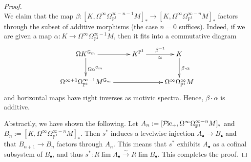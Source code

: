 \documentclass{amsart}
\theoremstyle{plain}
\theoremstyle{definition}
\theoremstyle{remark}
\numberwithin{equation}{theorem}
\newcommand{\mbb}[1]{\mathbb{#1}}
\newcommand{\OmegaP}{\Omega_{\mathbb{P}^1}}
\newcommand{\Pic}{{\mathcal{P}\mspace{-2.0mu}\mathrm{ic}}}
\begin{document}
\begin{proof}
\[\]
We claim that the map $\beta\colon[K,\Omega^\infty\OmegaP^{\infty-n-1}M]_*\to[K,\Omega^\infty\OmegaP^{\infty-n}M]_*$ factors through the subset of additive morphisms (the case $n=0$ suffices).
Indeed, if we are given a map $\alpha\colon K\to\Omega^\infty\OmegaP^{\infty-1} M$, then it fits into a commutative diagram
\[
\xymatrix{
	\Omega K^{\mbb{G}_m} \ar[r] \ar[d]^{\Omega\alpha^{\mbb{G}_m}} & K^{\mbb{P}^1} \ar[r]^-{\beta^{-1}}_-\simeq &  K \ar[d]^{\beta\cdot\alpha} \\
	\Omega^{\infty+1}\OmegaP^{\infty-1}M^{\mbb{G}_m} \ar[rr] & & \Omega^\infty\OmegaP^\infty M
}
\]
and horizontal maps have right inverses as motivic spectra.
Hence, $\beta\cdot\alpha$ is additive.

Abstractly, we have shown the following.
Let $A_n:=[\Pic_+,\Omega^\infty\OmegaP^{\infty-n}M]_*$ and $B_n:=[K,\Omega^\infty\OmegaP^{\infty-n}M]_*$.
Then $s^*$ induces a levelwise injection $A_\bullet\to B_\bullet$ and that $B_{n+1}\to B_n$ factors through $A_n$.
This means that $s^*$ exhibits $A_\bullet$ as a cofinal subsystem of $B_\bullet$, and thus $s^*\colon R\lim A_\bullet\xrightarrow{\sim}R\lim B_\bullet$.
This completes the proof.
\end{proof}
\end{document}
